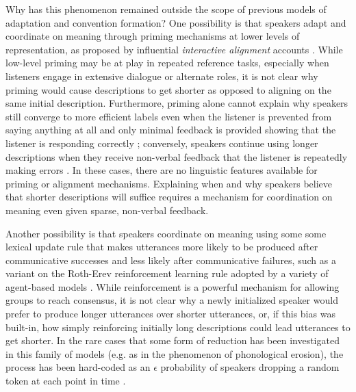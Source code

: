Why has this phenomenon remained outside the scope of previous models of adaptation and convention formation?
One possibility is that speakers adapt and coordinate on meaning through priming mechanisms at lower levels of representation, as proposed by influential  \emph{interactive alignment} accounts \cite{pickering2004toward, pickering2006alignment, garrod2009joint}.
While low-level priming may be at play in repeated reference tasks, especially when listeners engage in extensive dialogue or alternate roles, it is not clear why priming would cause descriptions to get shorter as opposed to aligning on the same initial description.
Furthermore, priming alone cannot explain why speakers still converge to more efficient labels even when the listener is prevented from saying anything at all and only minimal feedback is provided showing that the listener is responding correctly \cite{KraussWeinheimer66_Tangrams}; conversely, speakers continue using longer descriptions when they receive non-verbal feedback that the listener is repeatedly making errors \cite<see also>{hawkins2020characterizing}.
In these cases, there are no linguistic features available for priming or alignment mechanisms.
Explaining when and why speakers believe that shorter descriptions will suffice requires a mechanism for coordination on meaning even given sparse, non-verbal feedback.


Another possibility is that speakers coordinate on meaning using some some lexical update rule that makes utterances more likely to be produced after communicative successes and less likely after communicative failures, such as a variant on the Roth-Erev reinforcement learning rule \cite{erev1998predicting} adopted by a variety of agent-based models \cite{steels_self-organizing_1995,barr_establishing_2004,young_evolution_2015}.
While reinforcement is a powerful mechanism for allowing groups to reach consensus, it is not clear why a newly initialized speaker would prefer to produce longer utterances over shorter utterances, or, if this bias was built-in, how simply reinforcing initially long descriptions could lead utterances to get shorter. 
In the rare cases that some form of reduction has been investigated in this family of models (e.g. as in the phenomenon of phonological erosion), the process has been hard-coded as an $\epsilon$ probability of speakers dropping a random token at each point in time \cite{beuls2013agent,steels2016agent}.


